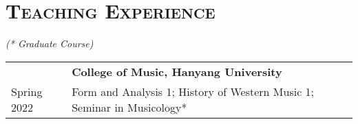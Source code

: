 \documentclass[letter,11pt,draft]{article}
\begin{document}
  
  \section*{\textsc{Teaching Experience}}
  \textit{(* Graduate Course)}
  \vspace{5.0mm}
    
  \hspace*{-0.77cm}
  \begin{tabular}{p{2.5cm} l}
    & \textbf{College of Music, Hanyang University}\\
    Spring 2022 & Form and Analysis 1; History of Western Music 1; Seminar in Musicology*
  \end{tabular}

  \hspace*{-0.77cm}
\end{document}
